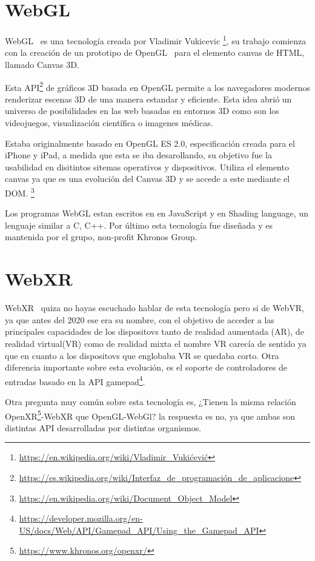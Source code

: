 \documentclass[a4paper, 12pt]{book}
\begin{document}
\section{WebGL} %
\label{sec:WebGl}
WebGL~\cite{webGl} es una tecnología creada por Vladimir Vukicevic \footnote{\url{https://en.wikipedia.org/wiki/Vladimir_Vukićević}}, su trabajo comienza con la creación de un prototipo de OpenGL~\cite{openGL} para el elemento canvas de HTML, llamado Canvas 3D. 

Esta API\footnote{\url{https://es.wikipedia.org/wiki/Interfaz_de_programación_de_aplicacione}} de gráficos 3D basada en OpenGL permite a los navegadores modernos renderizar escenas 3D de una manera estandar y eficiente. Esta idea abrió un universo de posibilidades en las web basadas en entornos 3D como son los videojuegos, visualización científica o imagenes médicas. 

Estaba originalmente basado en OpenGL ES 2.0, especificación creada para el iPhone y iPad, a medida que esta se iba desarollando, su objetivo fue la usabilidad en disitintos sitemas operativos y dispositivos. Utiliza el elemento canvas ya que es una evolución del Canvas 3D y se accede a este mediante el DOM. \footnote{\url{https://en.wikipedia.org/wiki/Document_Object_Model}}

Los programas WebGL estan escritos en en JavaScript y en Shading language, un lenguaje similar a C, C++. Por último esta tecnología fue diseñada y es mantenida por el grupo, non-profit Khronos Group.

\section{WebXR} %
\label{sec:WebXR}
WebXR~\cite{webXR} quiza no hayas escuchado hablar de esta tecnología pero si de WebVR, ya que antes del 2020 ese era su nombre, con el objetivo de acceder a las principales capacidades de los dispositovs tanto de realidad aumentada (AR), de realidad virtual(VR) como de realidad mixta el nombre VR carecía de sentido ya que en cuanto a los dispositovs que englobaba VR se quedaba corto. Otra diferencia importante sobre esta evolución, es el soporte de controladores de entradas basado en la API gamepad\footnote{\url{https://developer.mozilla.org/en-US/docs/Web/API/Gamepad_API/Using_the_Gamepad_API}}.

Otra pregunta muy común sobre esta tecnología es, ¿Tienen la misma relación OpenXR\footnote{\url{https://www.khronos.org/openxr/}}-WebXR que OpenGL-WebGl? la respuesta es no, ya que ambas son distintas API desarrolladas por distintas organismos. 
\end{document}
